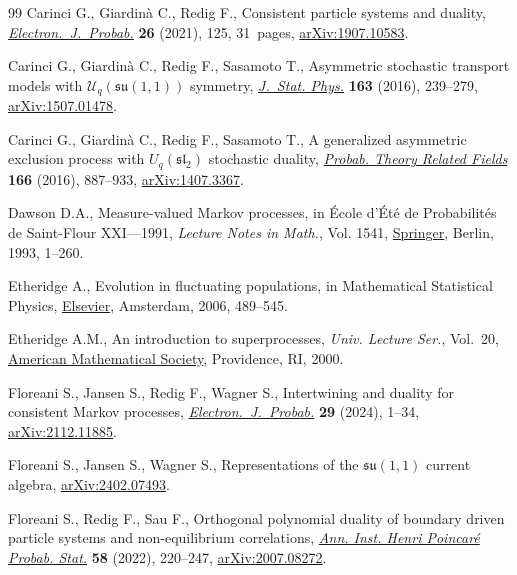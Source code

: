\documentclass[10pt,a4paper]{amsart}
\numberwithin{equation}{section}
\newcommand{\1}{\mathbbm{1}}
\begin{document}
\begin{thebibliography}{99}
Carinci G., Giardin\`a C., Redig F., Consistent particle systems and duality,
 \href{https://doi.org/10.1214/21-ejp684}{\textit{Electron.~J.~Probab.}} \textbf{26} (2021), 125, 31~pages,
 \href{https://arxiv.org/abs/1907.10583}{arXiv:1907.10583}.

Carinci G., Giardin\`a C., Redig F., Sasamoto T., Asymmetric stochastic
 transport models with {$\mathcal{U}_q(\mathfrak{su}(1,1))$} symmetry,
 \href{https://doi.org/10.1007/s10955-016-1473-4}{\textit{J.~Stat. Phys.}} \textbf{163} (2016), 239--279, \href{https://arxiv.org/abs/1507.01478}{arXiv:1507.01478}.

Carinci G., Giardin\`a C., Redig F., Sasamoto T., A generalized asymmetric
 exclusion process with {$U_q(\mathfrak{sl}_2)$} stochastic duality,
 \href{https://doi.org/10.1007/s00440-015-0674-0}{\textit{Probab. Theory Related Fields}} \textbf{166} (2016), 887--933,
 \href{https://arxiv.org/abs/1407.3367}{arXiv:1407.3367}.

Dawson D.A., Measure-valued {M}arkov processes, in \'Ecole d'\'Et\'e de
 {P}robabilit\'es de {S}aint-{F}lour {XXI}---1991, \textit{Lecture Notes in
 Math.}, Vol. 1541, \href{https://doi.org/10.1007/BFb0084190}{Springer}, Berlin, 1993, 1--260.

Etheridge A., Evolution in fluctuating populations, in Mathematical Statistical
 Physics, \href{https://doi.org/10.1016/S0924-8099(06)80048-X}{Elsevier}, Amsterdam, 2006, 489--545.

Etheridge A.M., An introduction to superprocesses, \textit{Univ. Lecture Ser.},
 Vol.~20, \href{https://doi.org/10.1090/ulect/020}{American Mathematical Society}, Providence, RI, 2000.

Floreani S., Jansen S., Redig F., Wagner S., Intertwining and duality for
 consistent {M}arkov processes, \href{https://doi.org/10.1214/24-ejp1124}{\textit{Electron.~J.~Probab.}} \textbf{29}
 (2024), 1--34, \href{https://arxiv.org/abs/2112.11885}{arXiv:2112.11885}.

Floreani S., Jansen S., Wagner S., Representations of the $\mathfrak{su}(1,1)$
 current algebra, \href{https://arxiv.org/abs/2402.07493}{arXiv:2402.07493}.

Floreani S., Redig F., Sau F., Orthogonal polynomial duality of boundary driven
 particle systems and non-equilibrium correlations, \href{https://doi.org/10.1214/21-aihp1163}{\textit{Ann. Inst. Henri
 Poincar\'e Probab. Stat.}} \textbf{58} (2022), 220--247, \href{https://arxiv.org/abs/2007.08272}{arXiv:2007.08272}.


\end{thebibliography}
\end{document}

